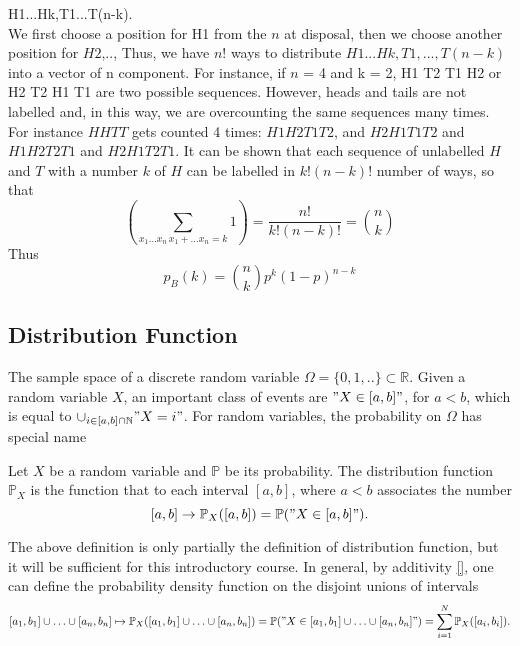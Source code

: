 H1...Hk,T1...T(n-k).\\
We first choose a position for H1 from the $n$ at disposal, then we choose another position for $H2$,.., 
Thus, we have $n!$ ways to distribute $H1...Hk,T1,...,T(n-k)$ into a vector of n component. For instance, if $n$ = 4 and k = 2, H1 T2 T1 H2 or H2 T2 H1 T1 are two possible sequences. However, heads and tails are not labelled and, in this way, we are overcounting the same sequences many times. For instance $H H T T $ gets counted 4 times: $ H1 H2 T1 T2 $, and $H2 H1 T1 T2$ and $ H1 H2 T2 T1$ and $H2 H1 T2 T1$. It can be shown that each sequence of unlabelled $H$ and $T$ with a number $k$ of $H$ can be labelled in $k!(n-k)!$ number of ways, so that 
\begin{equation}
    \left( \sum_{x_1...x_n \, x_1 + \ldots x_n = k} 1 \right)=  \frac{n!}{k!(n-k)!} = {n\choose k}
\end{equation}
Thus 
\begin{equation}
\label{e:Binomial}
    p_B(k) = {n\choose k}p^k(1-p)^{n-k}
\end{equation}

\subsection{Distribution Function}

    The sample space of a discrete random variable $\Omega = \{0,1,..\} \subset \mathbb R$. Given a random variable $X$, an important class of events are $" X \in [a,b]"$, for $a < b$, which is equal to $ \cup_{i \in [a,b] \cap \mathbb N} " X = i"$. For random variables, the probability on $\Omega$ has special name 
    \begin{definition}
        Let $X$ be a random variable and $\mathbb P$ be its probability. The distribution function $\mathbb P_X$ is the function that to each interval $[a,b]$, where $a < b$ associates the number 
        $$[a,b] \to \mathbb P_X ([a,b]) = \mathbb P("X \in [a,b]").$$
    \end{definition}
The above definition is only partially the definition of distribution function, but it will be sufficient for this introductory course. In general, by additivity \eqref{}, 
one can define the probability density function on the disjoint unions of intervals 
$$
        [a_1,b_1]\cup \ldots \cup[a_n,b_n] \mapsto \mathbb P_X([a_1,b_1]\cup \ldots \cup[a_n,b_n]) = \mathbb P("X \in [a_1,b_1]\cup \ldots \cup[a_n,b_n]" ) = \sum_{i=1}^N \mathbb P_X([a_i,b_i]).
        $$

